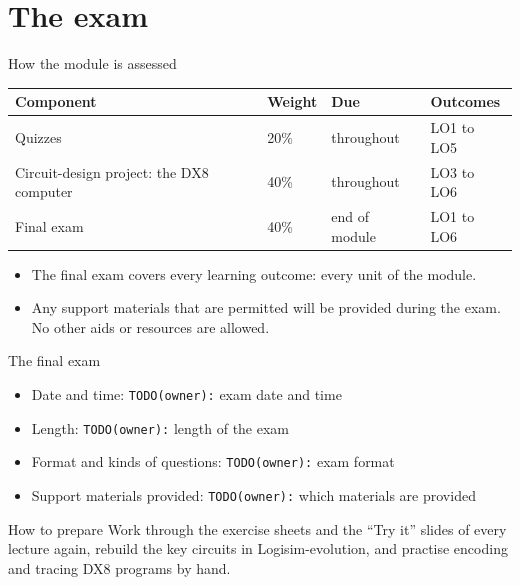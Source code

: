 \documentclass[10pt]{wosm-slides}
\newcommand*\todo[1]{\textcolor{wosm-brick}{\texttt{TODO(owner):} #1}}
\begin{document}
\section{The exam}

\begin{frame}{How the module is assessed}
  \begin{center}
    \begin{tabular}{@{}llll@{}}
      \toprule
      Component & Weight & Due & Outcomes \\
      \midrule
      Quizzes & 20\% & throughout & LO1 to LO5 \\
      Circuit-design project: the DX8 computer & 40\% & throughout & LO3 to LO6 \\
      Final exam & 40\% & end of module & LO1 to LO6 \\
      \bottomrule
    \end{tabular}
  \end{center}

  \begin{itemize}
    \item The final exam covers every learning outcome: every unit of the module.
    \item Any support materials that are permitted will be provided during the exam.
      No other aids or resources are allowed.
  \end{itemize}
\end{frame}

\begin{frame}{The final exam}
  \begin{itemize}
    \item Date and time: \todo{exam date and time}
    \item Length: \todo{length of the exam}
    \item Format and kinds of questions: \todo{exam format}
    \item Support materials provided: \todo{which materials are provided}
  \end{itemize}

  \begin{block}{How to prepare}
    Work through the exercise sheets and the ``Try it'' slides of every lecture
    again, rebuild the key circuits in Logisim-evolution, and practise encoding and
    tracing DX8 programs by hand.
  \end{block}
\end{frame}
\end{document}
